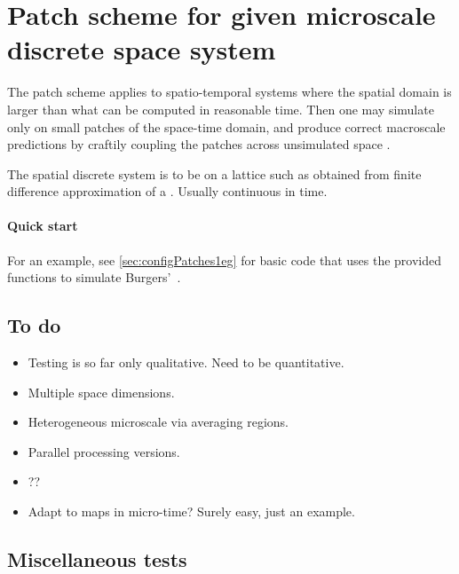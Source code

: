 \section{Patch scheme for given microscale discrete space system}
\label{sec:patch}
\secttoc

The patch scheme applies to spatio-temporal systems where
the spatial domain is larger than what can be computed in
reasonable time. Then one may simulate only on small patches
of the space-time domain, and produce correct macroscale
predictions by craftily coupling the patches across
unsimulated space \cite[e.g.]{Hyman2005, Samaey03b,
Samaey04, Roberts06d, Liu2015}.

The spatial discrete system is to be on a lattice such as
obtained from finite difference approximation of a \pde.
Usually continuous in time.

\paragraph{Quick start}
For an example, see \cref{sec:configPatches1eg} for basic code that uses the provided functions to simulate Burgers'~\pde.












\subsection{To do}
\begin{itemize}
\item Testing is so far only qualitative.  Need to be quantitative.
\item Multiple space dimensions.
\item Heterogeneous microscale via averaging regions.
\item Parallel processing versions.
\item ??
\item Adapt to maps in micro-time?  Surely easy, just an example.
\end{itemize}


\subsection{Miscellaneous tests}

